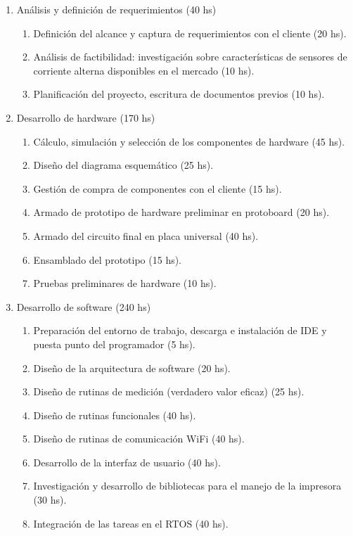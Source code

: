 \documentclass[11pt]{charter}
\begin{document}
\begin{enumerate}
\item Análisis y definición de requerimientos (40 hs)
	\begin{enumerate}
	\item Definición del alcance y captura de requerimientos con el cliente (20 hs).
	\item Análisis de factibilidad: investigación sobre características de sensores de corriente alterna disponibles en el mercado (10 hs).
	\item Planificación del proyecto, escritura de documentos previos (10 hs).
	\end{enumerate}
\item Desarrollo de hardware (170 hs)
	\begin{enumerate}
	\item Cálculo, simulación y selección de los componentes de hardware (45 hs).
	\item Diseño del diagrama esquemático (25 hs).
	\item Gestión de compra de componentes con el cliente (15 hs).
	\item Armado de prototipo de hardware preliminar en protoboard (20 hs).
	\item Armado del circuito final en placa universal (40 hs).
	\item Ensamblado del prototipo (15 hs).
	\item Pruebas preliminares de hardware (10 hs).
	\end{enumerate}
\item Desarrollo de software (240 hs)
	\begin{enumerate}
	\item Preparación del entorno de trabajo, descarga e instalación de IDE y puesta punto del programador (5 hs).
	\item Diseño de la arquitectura de software (20 hs).
	\item Diseño de rutinas de medición (verdadero valor eficaz) (25 hs).
	\item Diseño de rutinas funcionales (40 hs).
	\item Diseño de rutinas de comunicación WiFi (40 hs).
	\item Desarrollo de la interfaz de usuario (40 hs).
	\item Investigación y desarrollo de bibliotecas para el manejo de la impresora (30 hs).
	\item Integración de las tareas en el RTOS (40 hs).
	\end{enumerate}

\end{enumerate}
\end{document}
